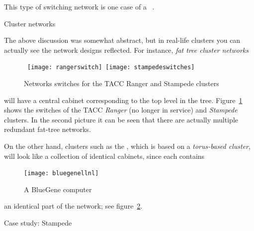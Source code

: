 This type of switching network is one case of a ~\cite{Clos1953}.


 {Cluster networks}

The above discussion was somewhat abstract, but in real-life clusters
you can actually see the network designs reflected. For instance,
\emph{fat tree cluster networks}
\begin{figure}[th]
  \hbox{%
    \texttt{[image: rangerswitch]}\kern1cm
    \texttt{[image: stampedeswitches]}%
  }
  \caption{Networks switches for the TACC Ranger and Stampede clusters}
  \label{fig:taccswitches}
\end{figure}
will have a central cabinet corresponding to the top level in the tree.
Figure~\ref{fig:taccswitches} shows the switches of the TACC
\emph{Ranger} (no longer in service)
and \emph{Stampede} clusters.
In the second picture it can be seen that there are actually
multiple redundant fat-tree networks.

On the other hand, clusters such as the ,
which is based on a \emph{torus-based cluster},
will look like a collection of identical cabinets, since each contains
\begin{figure}[th]
  \texttt{[image: bluegenellnl]}
  \caption{A BlueGene computer}
  \label{fig:bluegenep}
\end{figure}
an identical part of the network; see figure~\ref{fig:bluegenep}.

 {Case study: Stampede}
\label{sec:stampede-fattree}

